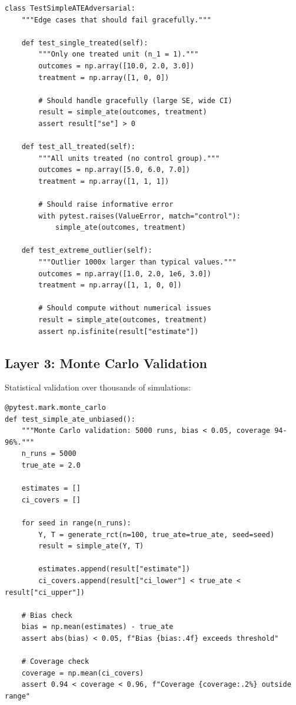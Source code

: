 \begin{verbatim}
class TestSimpleATEAdversarial:
    """Edge cases that should fail gracefully."""

    def test_single_treated(self):
        """Only one treated unit (n_1 = 1)."""
        outcomes = np.array([10.0, 2.0, 3.0])
        treatment = np.array([1, 0, 0])

        # Should handle gracefully (large SE, wide CI)
        result = simple_ate(outcomes, treatment)
        assert result["se"] > 0

    def test_all_treated(self):
        """All units treated (no control group)."""
        outcomes = np.array([5.0, 6.0, 7.0])
        treatment = np.array([1, 1, 1])

        # Should raise informative error
        with pytest.raises(ValueError, match="control"):
            simple_ate(outcomes, treatment)

    def test_extreme_outlier(self):
        """Outlier 1000x larger than typical values."""
        outcomes = np.array([1.0, 2.0, 1e6, 3.0])
        treatment = np.array([1, 1, 0, 0])

        # Should compute without numerical issues
        result = simple_ate(outcomes, treatment)
        assert np.isfinite(result["estimate"])
\end{verbatim}

\subsection{Layer 3: Monte Carlo Validation}

Statistical validation over thousands of simulations:

\begin{verbatim}
@pytest.mark.monte_carlo
def test_simple_ate_unbiased():
    """Monte Carlo validation: 5000 runs, bias < 0.05, coverage 94-96%."""
    n_runs = 5000
    true_ate = 2.0

    estimates = []
    ci_covers = []

    for seed in range(n_runs):
        Y, T = generate_rct(n=100, true_ate=true_ate, seed=seed)
        result = simple_ate(Y, T)

        estimates.append(result["estimate"])
        ci_covers.append(result["ci_lower"] < true_ate < result["ci_upper"])

    # Bias check
    bias = np.mean(estimates) - true_ate
    assert abs(bias) < 0.05, f"Bias {bias:.4f} exceeds threshold"

    # Coverage check
    coverage = np.mean(ci_covers)
    assert 0.94 < coverage < 0.96, f"Coverage {coverage:.2%} outside range"
\end{verbatim}


